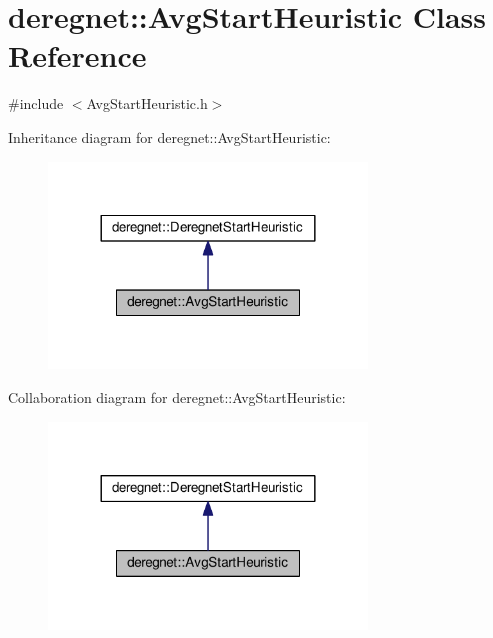 \hypertarget{classderegnet_1_1AvgStartHeuristic}{}\section{deregnet\+:\+:Avg\+Start\+Heuristic Class Reference}
\label{classderegnet_1_1AvgStartHeuristic}


{\ttfamily \#include $<$Avg\+Start\+Heuristic.\+h$>$}



Inheritance diagram for deregnet\+:\+:Avg\+Start\+Heuristic\+:\nopagebreak
\begin{figure}[H]
\begin{center}
\leavevmode
\includegraphics[width=240pt]{classderegnet_1_1AvgStartHeuristic__inherit__graph}
\end{center}
\end{figure}


Collaboration diagram for deregnet\+:\+:Avg\+Start\+Heuristic\+:\nopagebreak
\begin{figure}[H]
\begin{center}
\leavevmode
\includegraphics[width=240pt]{classderegnet_1_1AvgStartHeuristic__coll__graph}
\end{center}
\end{figure}
